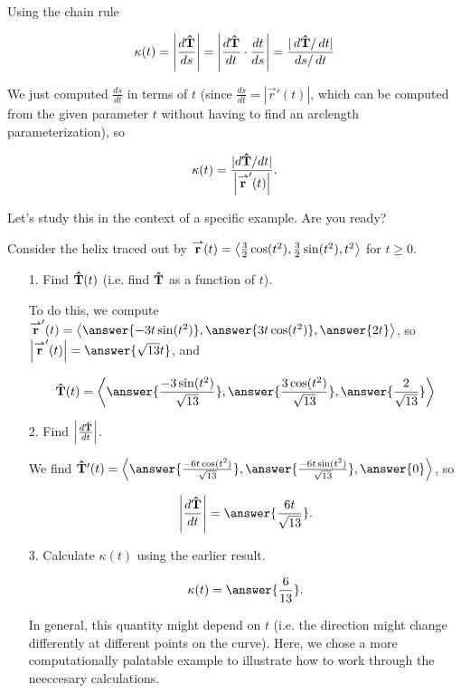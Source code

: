 \documentclass{ximera}
\begin{document}
\begin{exercise}
\begin{exercise}
\begin{exercise}
\begin{exercise}
Using the chain rule

\[ \kappa(t) =  \left| \frac{\d \uvec{T}}{\d s} \right| =  \left| \frac{\d \uvec{T}}{\d t} \cdot \frac{\d t}{\d s} \right| =  \frac{|\d \uvec{T}/ \d t|}{\d s/ \d t} \] 

We just computed $\frac{ds}{dt}$ in terms of $t$ (since $\frac{ds}{dt} = |\vec{r}'(t)|$, which can be computed from the given parameter $t$ without having to find an arclength parameterization), so 

\[ \kappa(t) =  \frac{|d\mathbf{\hat{T}}/dt|}{ \left| {\overset{\boldsymbol{\rightharpoonup}}{\mathbf{r}}}  '(t) \right|}. \]

Let's study this in the context of a specific example.  Are you ready?

\begin{multipleChoice}
\end{multipleChoice}

\begin{exercise}

Consider the helix traced out by ${\overset{\boldsymbol{\rightharpoonup}}{\mathbf{r}}}(t) = \left\langle \frac{3}{2}\cos (t^2), \frac{3}{2}\sin (t^2), t^2\right\rangle$ for $t \geq 0$.

\begin{itemize}
\item[1.] Find $\mathbf{\hat{T}}(t)$ (i.e. find $\mathbf{\hat{T}}$ as a function of $t$).

To do this, we compute $\vec{r}'(t)=\vector{ \answer{-3t \sin(t^2)}, \answer{3t \cos(t^2)}, \answer{2t}}$, so $\left|\vec{r}'(t)\right| = \answer{\sqrt{13}t}$, and 

\[
\uvec{T}(t) =\vector{ \answer{\frac{-3 \sin(t^2)}{\sqrt{13}}}, \answer{\frac{3 \cos(t^2)}{\sqrt{13}}}, \answer{\frac{2}{\sqrt{13}}}}
\]
\item[2.] Find $\left|\frac{\mathop{}\!d \mathbf{\hat{T}}}{\mathop{}\!d t}\right|$.

We find $\uvec{T}'(t) = \vector{ \answer{\frac{-6t \cos(t^2)}{\sqrt{13}}}, \answer{\frac{-6t \sin(t^2)}{\sqrt{13}}}, \answer{0}}$, so 

\[
\left|\frac{\d \uvec{T}}{\d t}\right| = \answer{\frac{6t}{\sqrt{13}}}.
\]

\item[3.] Calculate $\kappa(t)$ using the earlier result.

\[
\kappa(t) = \answer{\frac{6}{13}}.
\]

\begin{feedback}[correct]
In general, this quantity might depend on $t$ (i.e. the direction might change differently at different points on the curve).  Here, we chose a more computationally palatable example to illustrate how to work through the neeccesary calculations.
\end{feedback}
\end{itemize}

\end{exercise}
\end{exercise}
\end{exercise}
\end{exercise}
 \end{exercise}
\end{document}
